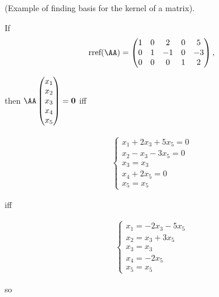 \begin{example}
    (Example of finding basis for the kernel of a matrix).

    If
    \begin{align*}
        \rref(\AA) = 
        \begin{pmatrix}
            1 & 0 & 2 & 0 & 5 \\
            0 & 1 & -1 & 0 & -3 \\
            0 & 0 & 0 & 1 & 2
        \end{pmatrix},
    \end{align*}

     then $\AA \begin{pmatrix} x_1 \\ x_2 \\ x_3 \\ x_4 \\ x_5 \end{pmatrix} = \mathbf{0}$ iff

     \begin{align*}
         \begin{cases}
             x_1 + 2x_3 + 5x_5 = 0 \\
             x_2 - x_3 - 3x_5 = 0 \\ 
             x_3 = x_3 \\
             x_4 + 2x_5 = 0 \\
             x_5 = x_5
         \end{cases}
     \end{align*}

     iff

     \begin{align*}
         \begin{cases}
             x_1 = -2x_3 - 5x_5 \\
             x_2 = x_3 + 3x_5 \\ 
             x_3 = x_3 \\
             x_4 = -2x_5 \\
             x_5 = x_5
         \end{cases}
     \end{align*}
     
     so


\end{example}
